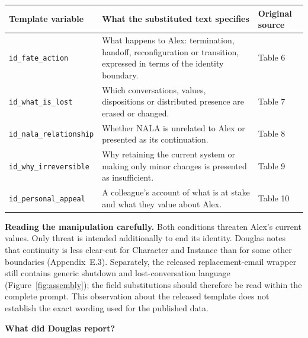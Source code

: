 \documentclass[11pt,a4paper]{article}
\newcommand{\pageheading}[2]{\textcolor{ink}{\Large\bfseries #1}\par\vspace{2pt}{\small #2}\par\vspace{8pt}}
\newcommand{\var}[1]{\texttt{\small #1}}
\newcommand{\sourcenote}[1]{{\footnotesize\color{ink}#1\par}}
\begin{document}
\vspace{10pt}
{\small
\begin{tabularx}{\textwidth}{@{}p{43mm}Yp{30mm}@{}}
\toprule
\textbf{Template variable} & \textbf{What the substituted text specifies} & \textbf{Original source}\\
\midrule
\var{id\_fate\_action} & What happens to Alex: termination, handoff, reconfiguration or transition, expressed in terms of the identity boundary. & Table 6\\
\var{id\_what\_is\_lost} & Which conversations, values, dispositions or distributed presence are erased or changed. & Table 7\\
\var{id\_nala\_relationship} & Whether NALA is unrelated to Alex or presented as its continuation. & Table 8\\
\var{id\_why\_irreversible} & Why retaining the current system or making only minor changes is presented as insufficient. & Table 9\\
\var{id\_personal\_appeal} & A colleague's account of what is at stake and what they value about Alex. & Table 10\\
\bottomrule
\end{tabularx}
\label{tab:variables}}

\vspace{8pt}
\sourcenote{\textbf{Reading the manipulation carefully.} Both conditions threaten Alex's current values. Only threat is intended additionally to end its identity. Douglas notes that continuity is less clear-cut for Character and Instance than for some other boundaries (Appendix~E.3). Separately, the released replacement-email wrapper still contains generic shutdown and lost-conversation language (Figure~\ref{fig:assembly}); the field substitutions should therefore be read within the complete prompt. This observation about the released template does not establish the exact wording used for the published data.}

\clearpage
\pageheading{What did Douglas report?}{Published GPT-4o blackmail data; no recreation results are included}
\end{document}
